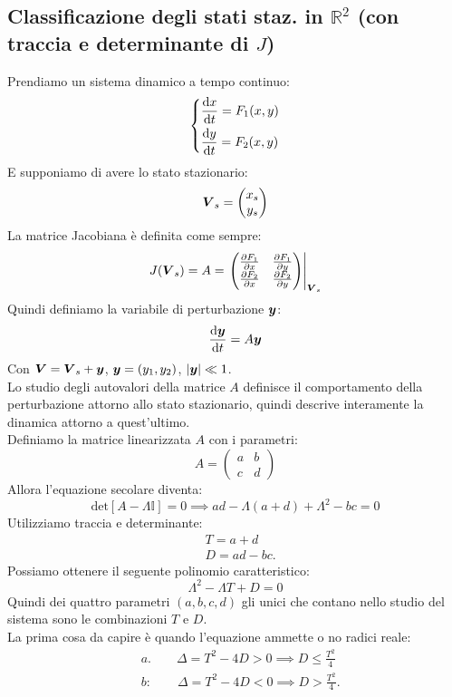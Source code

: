 \subsection{Classificazione degli stati staz. in $\mathbb{R}^2$ (con traccia e determinante di $J$)}%
Prendiamo un sistema dinamico a tempo continuo:
\[\begin{dcases}
    \frac{\text{d} x}{\text{d} t} = F_1(x, y)\\
    \frac{\text{d} y}{\text{d} t} = F_2(x, y)
\end{dcases}\] 
E supponiamo di avere lo stato stazionario:
\[
    \boldsymbol{V}_s= \begin{pmatrix} x_s \\ y_s \end{pmatrix} 
\] 
La matrice Jacobiana è definita come sempre:
\[
    J(\boldsymbol{V}_s) =A = \left.\begin{pmatrix} \frac{\partial F_1}{\partial x} & \frac{\partial F_1}{\partial y} \\ \frac{\partial F_2}{\partial x} & \frac{\partial F_2}{\partial y}  \end{pmatrix} \right|_{\boldsymbol{V}_s}
\] 
Quindi definiamo la variabile di perturbazione $\boldsymbol{y}$:
\[
    \frac{\text{d} \boldsymbol{y}}{\text{d} t} = A\boldsymbol{y}
\] 
Con $\boldsymbol{V}  = \boldsymbol{V}_s + \boldsymbol{y}$, $\boldsymbol{y}  = (y_1, y_2)$, $\left|\boldsymbol{y}\right|\ll 1$.\\
Lo studio degli autovalori della matrice $A$  definisce il comportamento della perturbazione attorno allo stato stazionario, quindi descrive interamente la dinamica attorno a quest'ultimo.\\
Definiamo la matrice linearizzata $A$  con i parametri:
\[
    A = \begin{pmatrix} a & b \\ c & d \end{pmatrix} 
\] 
Allora l'equazione secolare diventa:
\[
    \text{det}\left[A-\Lambda\mathbb{I}\right]=0 \implies ad - \Lambda (a+d)+\Lambda^2-bc = 0
\] 
Utilizziamo traccia e determinante:
\[\begin{aligned}
    & T = a+d \\
    & D = ad-bc
.\end{aligned}\]
Possiamo ottenere il seguente polinomio caratteristico:
\[
    \Lambda^2-\Lambda T+D = 0
\] 
Quindi dei quattro parametri $(a,b,c,d)$  gli unici che contano nello studio del sistema sono le combinazioni $T$  e $D$.\\
La prima cosa da capire è quando l'equazione ammette o no radici reale:
\[\begin{aligned}
    &a. \qquad \Delta  = T^2-4D>0 \implies  D \le \frac{T^2}{4}\\
    &b:\qquad \Delta  = T^2-4D<0 \implies  D > \frac{T^2}{4}
.\end{aligned}\]

